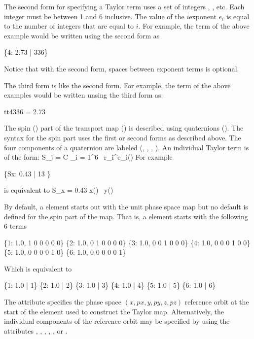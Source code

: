 {The second form for specifying a Taylor term uses a set of integers ,
, etc. Each integer must be between 1 and 6 inclusive. The value of 
the $i$\Th exponent $e_i$ is equal to the number of integers that are equal
to $i$. For example, the term of the above example would be written using
the second form as
\begin{example}
  \{4: 2.73 | 336\}
\end{example}
Notice that with the second form, spaces between exponent terms is optional.

The third form is like the second form. For example, the term of the above examples
would be written unsing the third form as:
\begin{example}
  tt4336 = 2.73
\end{example}

The spin () part of the transport map () is described using
quaternions (). The syntax for the spin part uses the first or second forms as
described above. The four components of a quaternion are labeled (, , ,
).  An individual Taylor term is of the form:
\Begineq
  S_j = C \cdot \Pi_{i = 1}^6 \, \delta r_i^{e_i}(\In)
\Endeq
For example
\begin{example}
  \{Sx: 0.43 | 13 \}
\end{example}
is equivalent to
\Begineq
  S_x = 0.43 \cdot \delta x(\In) \, \delta y(\In)
\Endeq

By default, a  element starts out with the unit phase space map but no default
is defined for the spin part of the map.  That is, a  element starts with the
following 6 terms
\begin{example}
  \{1: 1.0, 1 0 0 0 0 0\}
  \{2: 1.0, 0 1 0 0 0 0\}
  \{3: 1.0, 0 0 1 0 0 0\}
  \{4: 1.0, 0 0 0 1 0 0\}
  \{5: 1.0, 0 0 0 0 1 0\}
  \{6: 1.0, 0 0 0 0 0 1\}
\end{example}
Which is equivalent to
\begin{example}
  \{1: 1.0 | 1\}
  \{2: 1.0 | 2\}
  \{3: 1.0 | 3\}
  \{4: 1.0 | 4\}
  \{5: 1.0 | 5\}
  \{6: 1.0 | 6\}
\end{example}

The  attribute specifies the phase space $(x, px, y, py, z, pz)$ reference
orbit at the start of the element used to construct the Taylor map. Alternatively, the
individual components of the reference orbit may be specified by using the attributes 
, , , , , or .

}
